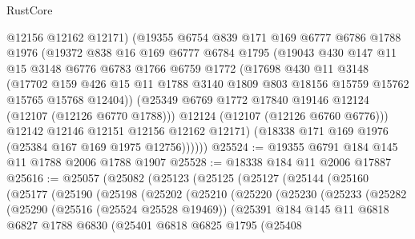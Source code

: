 \begin{lexlean}{RustCore}
\begin{coremodule}
            @12156
            @12162
            @12171)
          (@19355
            @6754
            @839
            @171
            @169
            @6777
            @6786
            @1788
            @1976
            (@19372
              @838
              @16
              @169
              @6777
              @6784
              @1795
              (@19043
                @430
                @147
                @11
                @15
                @3148
                @6776
                @6783
                @1766
                @6759
                @1772
                (@17698
                  @430
                  @11
                  @3148
                  (@17702
                    @159
                    @426
                    @15
                    @11
                    @1788
                    @3140
                    @1809
                    @803
                    @18156
                    @15759
                    @15762
                    @15765
                    @15768
                    @12404))
                (@25349 @6769 @1772 @17840 @19146 @12124 (@12107 (@12126 @6770 @1788)))
                @12124
                (@12107 (@12126 @6760 @6776)))
              @12142
              @12146
              @12151
              @12156
              @12162
              @12171)
            (@18338 @171 @169 @1976 (@25384 @167 @169 @1975 @12756))))))
@25524 := @19355 @6791 @184 @145 @11 @1788 @2006 @1788 @1907
@25528 := @18338 @184 @11 @2006 @17887
@25616 := @25057
    (@25082
      (@25123
        (@25125
          (@25127
            (@25144
              (@25160
                (@25177
                  (@25190
                    (@25198
                      (@25202
                        (@25210
                          (@25220
                            (@25230
                              (@25233
                                (@25282
                                  (@25290
                                    (@25516 (@25524 @25528 @19469))
                                    (@25391
                                      @184
                                      @145
                                      @11
                                      @6818
                                      @6827
                                      @1788
                                      @6830
                                      (@25401
                                        @6818
                                        @6825
                                        @1795
                                        (@25408

\end{coremodule}
\end{lexlean}
